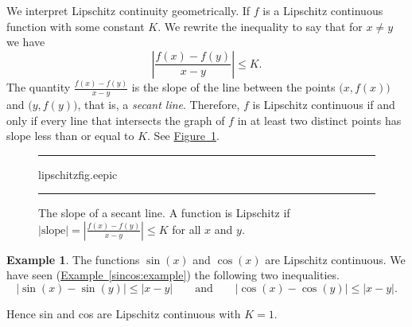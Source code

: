 \documentclass[12pt]{book}
\newenvironment{myfigureht}{%
\begin{figure}[h!t]
\noindent\rule{\textwidth}{0.4pt}\vspace{12pt}\par\centering}%
{\par\noindent\rule{\textwidth}{0.4pt}
\end{figure}}
\newcommand{\abs}[1]{\left\lvert {#1} \right\rvert}
\newcommand{\myindex}[1]{#1\index{#1}}
\theoremstyle{plain}
\theoremstyle{remark}
\theoremstyle{definition}
\theoremstyle{exercise}
\theoremstyle{example}
\newtheorem{example}[thm]{Example}
\newcommand{\figureref}[1]{\hyperref[#1]{Figure~\ref*{#1}}}
\newcommand{\exampleref}[1]{\hyperref[#1]{Example~\ref*{#1}}}
\begin{document}
We interpret Lipschitz continuity geometrically.  If $f$ is a Lipschitz
continuous function with some constant $K$.  We rewrite the inequality 
to say that for $x \not=y$ we have
\begin{equation*}
\abs{\frac{f(x)-f(y)}{x-y}} \leq K .
\end{equation*}
The quantity $\frac{f(x)-f(y)}{x-y}$ is the slope of the line
between the points $\bigl(x,f(x)\bigr)$
and $\bigl(y,f(y)\bigr)$, that is, a \emph{\myindex{secant line}}.  Therefore, $f$ is Lipschitz
continuous if and only if every line that intersects the graph of $f$ in at least two
distinct
points has slope less than or equal to $K$.  See \figureref{fig:lipschitz}.
\begin{myfigureht}
{lipschitzfig.eepic}
\caption{The slope of a secant line.
A function is Lipschitz if $\abs{\text{slope}} =
\abs{\frac{f(x)-f(y)}{x-y}} \leq K$ for all $x$ and $y$.\label{fig:lipschitz}}
\end{myfigureht}

\begin{example}
The functions $\sin(x)$ and $\cos(x)$ are Lipschitz continuous.
We have seen (\exampleref{sincos:example}) the following two inequalities.
\begin{equation*}
\abs{\sin(x)-\sin(y)} 
\leq \abs{x-y}
\qquad \text{and} \qquad
\abs{\cos(x)-\cos(y)}
\leq \abs{x-y} .
\end{equation*}

Hence sin and cos are Lipschitz continuous with $K=1$.
\end{example}
\end{document}
